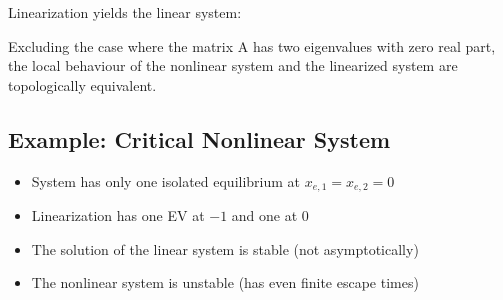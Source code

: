 \documentclass[10pt,a4paper]{scrartcl}
\begin{document}
\begin{multicols*}{3}
Linearization yields the linear system:


Excluding the case where the matrix A has two eigenvalues with zero real part, the local behaviour of the nonlinear system and the linearized system are topologically equivalent.



\subsection{Example: Critical Nonlinear System}


\begin{itemize}
\ncompaq
\item System has only one isolated equilibrium at $x_{e,1}=x_{e,2}=0$
\item Linearization has one EV at $-1$ and one at $0$
\item The solution of the linear system is stable (not asymptotically)
\item The nonlinear system is unstable (has even finite escape times)
\end{itemize}




\end{multicols*}
\end{document}

